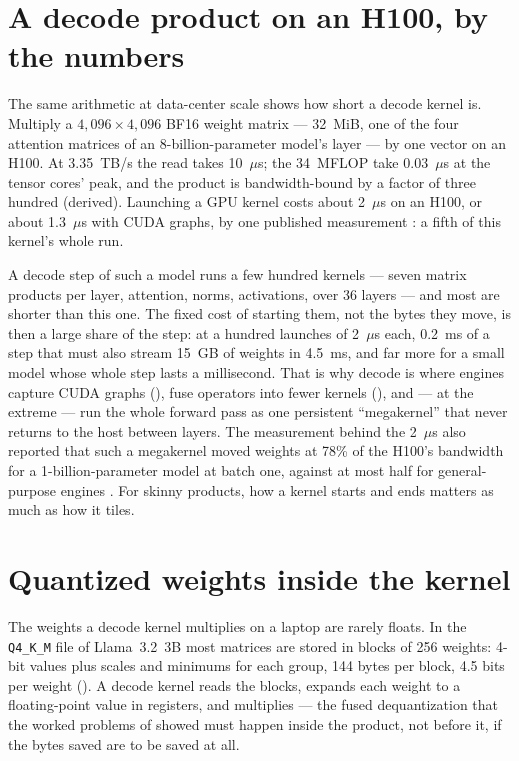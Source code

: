 \section{A decode product on an H100, by the numbers}

The same arithmetic at data-center scale shows how short a decode kernel is.
Multiply a $4{,}096 \times 4{,}096$ BF16 weight matrix --- 32~MiB, one of the four
attention matrices of an 8-billion-parameter model's layer --- by one vector on an
H100. At 3.35~TB/s the read takes 10~$\mu$s; the 34~MFLOP take 0.03~$\mu$s at the
tensor cores' peak, and the product is bandwidth-bound by a factor of three
hundred (derived). Launching a GPU kernel costs about 2~$\mu$s on an H100, or about
1.3~$\mu$s with CUDA graphs, by one published measurement
\cite{spector2025megakernel}: a fifth of this kernel's whole run.

A decode step of such a model runs a few hundred kernels --- seven matrix products
per layer, attention, norms, activations, over 36 layers --- and most are shorter
than this one. The fixed cost of starting them, not the bytes they move, is then
a large share of the step: at a hundred launches of 2~$\mu$s each, 0.2~ms of a step
that must also stream 15~GB of weights in 4.5~ms, and far more for a small model
whose whole step lasts a millisecond. That is why decode is where engines capture
CUDA graphs (), fuse operators into fewer kernels
(), and --- at the extreme --- run the whole forward pass as
one persistent ``megakernel'' that never returns to the host between layers. The
measurement behind the 2~$\mu$s also reported that such a megakernel moved weights
at 78\% of the H100's bandwidth for a 1-billion-parameter model at batch one,
against at most half for general-purpose engines \cite{spector2025megakernel}. For
skinny products, how a kernel starts and ends matters as much as how it tiles.

\section{Quantized weights inside the kernel}

The weights a decode kernel multiplies on a laptop are rarely floats. In the
\texttt{Q4\_K\_M} file of Llama~3.2~3B most matrices are stored in blocks of 256
weights: 4-bit values plus scales and minimums for each group, 144 bytes per
block, 4.5 bits per weight (). A decode kernel reads the
blocks, expands each weight to a floating-point value in registers, and
multiplies --- the fused dequantization that the worked problems of
 showed must happen inside the product, not before it, if the
bytes saved are to be saved at all.


